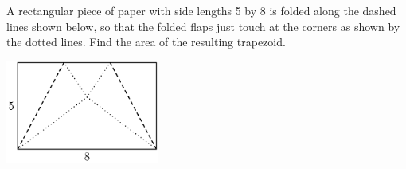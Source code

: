 A rectangular piece of paper with side lengths 5 by 8 is folded along the dashed lines shown below, so that the folded flaps just touch at the corners as shown by the dotted lines. Find the area of the resulting trapezoid.

\begin{center}
\includegraphics[width = 50.400000000000006mm]{img/fig0.png}
\end{center}